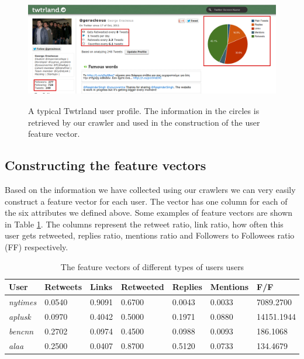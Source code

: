 \begin{figure}[htbp]
  \begin{center}
    \includegraphics[height=1.9in, width=6in]{twtrland-page}
    \caption{A typical Twtrland user profile. The information in the circles is retrieved by our crawler and used in the construction of the user feature vector.}
    \label{TwtrlandPage}
  \end{center}
\end{figure} 

\subsection{Constructing the feature vectors}
Based on the information we have collected using our crawlers we can very easily construct a feature vector for each user. The vector has one column for each of the six attributes we 
defined above. Some examples of feature vectors are shown in Table \ref{FeatureVectors}. The columns represent the retweet ratio, link ratio, how often this user gets retweeted, replies ratio, mentions ratio and Followers to Followees ratio (FF) respectively. 

\begin{table}[htbp]
\footnotesize
\centering
\begin{tabular}{ l  l  l  l  l  l  l }
  \hline
  \textbf{User} & \textbf{Retweets} & \textbf{Links} & \textbf{Retweeted} & \textbf{Replies} & \textbf{Mentions} & \textbf{F/F} \\ \hline
  \emph{nytimes} & 0.0540 & 0.9091 & 0.6700 & 0.0043 & 0.0033 & 7089.2700 \\
  \emph{aplusk} & 0.0970 & 0.4042 & 0.5000 & 0.1971 & 0.0880 & 14151.1944 \\
  \emph{bencnn} & 0.2702 & 0.0974 & 0.4500 & 0.0988 & 0.0093 & 186.1068 \\
  \emph{alaa} & 0.2500 & 0.0407 & 0.8700 & 0.5120 & 0.0733 & 134.4679 \\
  \hline
\end{tabular}
\caption{The feature vectors of different types of users users}
\label{FeatureVectors}
\end{table}

